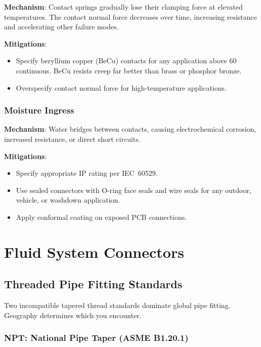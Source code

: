 \textbf{Mechanism}: Contact springs gradually lose their clamping force at elevated temperatures. The contact normal force decreases over time, increasing resistance and accelerating other failure modes.

\textbf{Mitigations}:
\begin{itemize}[nosep,leftmargin=1.5em]
  \item Specify beryllium copper (BeCu) contacts for any application above 60\,\degC{} continuous. BeCu resists creep far better than brass or phosphor bronze.
  \item Overspecify contact normal force for high-temperature applications.
\end{itemize}

\subsubsection{Moisture Ingress}

\textbf{Mechanism}: Water bridges between contacts, causing electrochemical corrosion, increased resistance, or direct short circuits.

\textbf{Mitigations}:
\begin{itemize}[nosep,leftmargin=1.5em]
  \item Specify appropriate IP rating per IEC~60529.
  \item Use sealed connectors with O-ring face seals and wire seals for any outdoor, vehicle, or washdown application.
  \item Apply conformal coating on exposed PCB connections.
\end{itemize}


\section{Fluid System Connectors}

\subsection{Threaded Pipe Fitting Standards}

Two incompatible tapered thread standards dominate global pipe fitting. Geography determines which you encounter.

\subsubsection{NPT: National Pipe Taper (ASME B1.20.1)}

